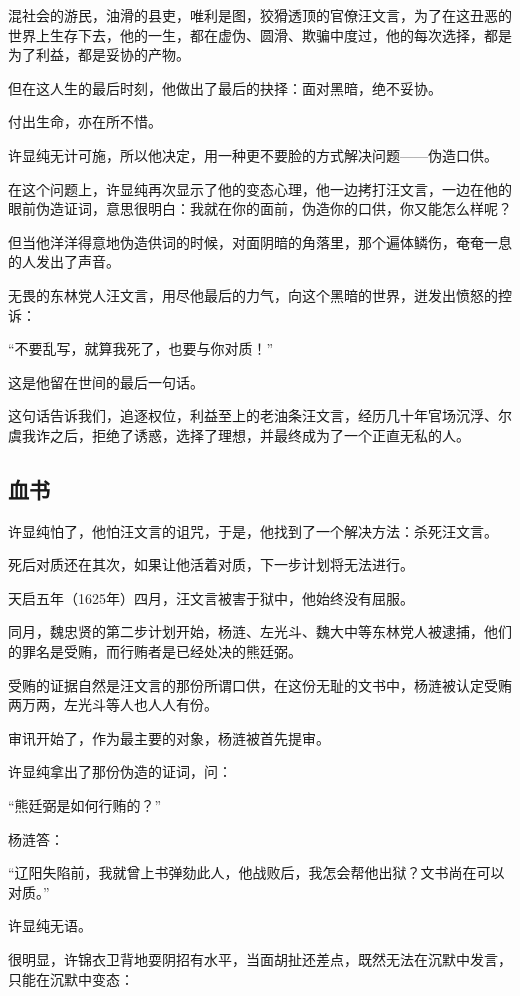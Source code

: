 \begin{multicols}{\theparacolNo}
混社会的游民，油滑的县吏，唯利是图，狡猾透顶的官僚汪文言，为了在这丑恶的世界上生存下去，他的一生，都在虚伪、圆滑、欺骗中度过，他的每次选择，都是为了利益，都是妥协的产物。

但在这人生的最后时刻，他做出了最后的抉择：面对黑暗，绝不妥协。

付出生命，亦在所不惜。

许显纯无计可施，所以他决定，用一种更不要脸的方式解决问题——伪造口供。

在这个问题上，许显纯再次显示了他的变态心理，他一边拷打汪文言，一边在他的眼前伪造证词，意思很明白：我就在你的面前，伪造你的口供，你又能怎么样呢？

但当他洋洋得意地伪造供词的时候，对面阴暗的角落里，那个遍体鳞伤，奄奄一息的人发出了声音。

无畏的东林党人汪文言，用尽他最后的力气，向这个黑暗的世界，迸发出愤怒的控诉：

“不要乱写，就算我死了，也要与你对质！”

这是他留在世间的最后一句话。

这句话告诉我们，追逐权位，利益至上的老油条汪文言，经历几十年官场沉浮、尔虞我诈之后，拒绝了诱惑，选择了理想，并最终成为了一个正直无私的人。

\subsection{血书}
许显纯怕了，他怕汪文言的诅咒，于是，他找到了一个解决方法：杀死汪文言。

死后对质还在其次，如果让他活着对质，下一步计划将无法进行。

天启五年（1625年）四月，汪文言被害于狱中，他始终没有屈服。

同月，魏忠贤的第二步计划开始，杨涟、左光斗、魏大中等东林党人被逮捕，他们的罪名是受贿，而行贿者是已经处决的熊廷弼。

受贿的证据自然是汪文言的那份所谓口供，在这份无耻的文书中，杨涟被认定受贿两万两，左光斗等人也人人有份。

审讯开始了，作为最主要的对象，杨涟被首先提审。

许显纯拿出了那份伪造的证词，问：

“熊廷弼是如何行贿的？”

杨涟答：

“辽阳失陷前，我就曾上书弹劾此人，他战败后，我怎会帮他出狱？文书尚在可以对质。”

许显纯无语。

很明显，许锦衣卫背地耍阴招有水平，当面胡扯还差点，既然无法在沉默中发言，只能在沉默中变态：


\end{multicols}

